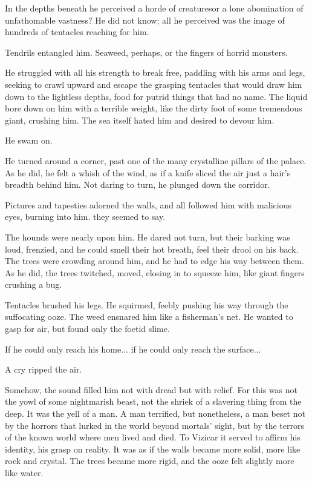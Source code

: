In the depths beneath he perceived a horde of creatures\dash or a lone abomination of unfathomable vastness? He did not know; all he perceived was the image of hundreds of tentacles reaching for him. 

Tendrils entangled him. Seaweed, perhaps, or the fingers of horrid monsters. 

He struggled with all his strength to break free, paddling with his arms and legs, seeking to crawl upward and escape the grasping tentacles that would draw him down to the lightless depths, food for putrid things that had no name. The liquid bore down on him with a terrible weight, like the dirty foot of some tremendous giant, crushing him. The sea itself hated him and desired to devour him. 

He swam on. 

He turned around a corner, past one of the many crystalline pillars of the palace. As he did, he felt a whish of the wind, as if a knife sliced the air just a hair's breadth behind him. Not daring to turn, he plunged down the corridor. 

Pictures and tapesties adorned the walls, and all followed him with malicious eyes, burning into him. 
 they seemed to say. 

The hounds were nearly upon him. He dared not turn, but their barking was loud, frenzied, and he could smell their hot breath, feel their drool on his back. The trees were crowding around him, and he had to edge his way between them. As he did, the trees twitched, moved, closing in to squeeze him, like giant fingers crushing a bug. 

Tentacles brushed his legs. He squirmed, feebly pushing his way through the suffocating ooze. The weed ensnared him like a fisherman's net. He wanted to gasp for air, but found only the foetid slime.

If he could only reach his home... if he could only reach the surface... 


A cry ripped the air.

Somehow, the sound filled him not with dread but with relief. For this was not the yowl of some nightmarish beast, not the shriek of a slavering thing from the deep. It was the yell of a man. A man terrified, but nonetheless, a man beset not by the horrors that lurked in the world beyond mortals' sight, but by the terrors of the known world where men lived and died. To Vizicar it served to affirm his identity, his grasp on reality. It was as if the walls became more solid, more like rock and crystal. The trees became more rigid, and the ooze felt slightly more like water. 

